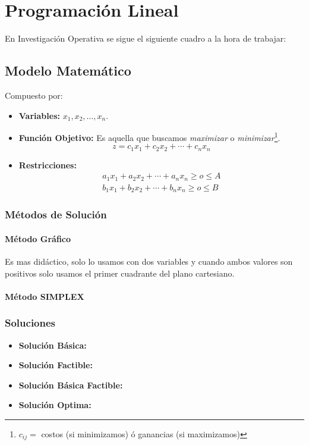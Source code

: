 \documentclass[10pt,a4paper]{book}
\begin{document}

\chapter{Programación Lineal}
En Investigación Operativa se sigue el siguiente cuadro a la hora de trabajar:
\begin{center}
\end{center}

\section{Modelo Matemático}
Compuesto por:
\begin{itemize}
\item \textbf{Variables:} $x_1,x_2,\ldots ,x_n$.
\item \textbf{Función Objetivo:} Es aquella que buscamos \textit{maximizar} o \textit{minimizar}\footnote{$c_{ij}=$ costos (si minimizamos) ó ganancias (si maximizamos)}. 
$$z = c_1 x_1 + c_2 x_2 + \cdots +c_n x_n$$
\item \textbf{Restricciones:}
\begin{align*}
a_1 x_1 + a_2 x_2 + \cdots + a_n x_n \geq o \leq A\\
b_1 x_1 + b_2 x_2 + \cdots + b_n x_n \geq o \leq B
\end{align*}
\end{itemize}
\subsection{Métodos de Solución}
\subsubsection{Método Gráfico}
Es mas didáctico, solo lo usamos con dos variables y cuando ambos valores son positivos solo usamos el primer cuadrante del plano cartesiano.
\subsubsection{Método SIMPLEX}
\subsection{Soluciones}
\begin{itemize}
\item \textbf{Solución Básica:}
\item \textbf{Solución Factible:}
\item \textbf{Solución Básica Factible:}
\item \textbf{Solución Optima:}
\end{itemize}
\end{document}
